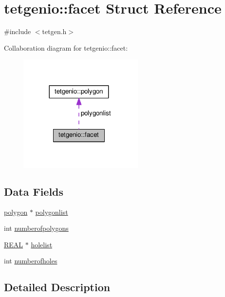 \hypertarget{structtetgenio_1_1facet}{}\section{tetgenio\+:\+:facet Struct Reference}
\label{structtetgenio_1_1facet}


{\ttfamily \#include $<$tetgen.\+h$>$}



Collaboration diagram for tetgenio\+:\+:facet\+:
\nopagebreak
\begin{figure}[H]
\begin{center}
\leavevmode
\includegraphics[width=176pt]{structtetgenio_1_1facet__coll__graph}
\end{center}
\end{figure}
\subsection*{Data Fields}
\begin{DoxyCompactItemize}
\item 
\hyperlink{structtetgenio_1_1polygon}{polygon} $\ast$ \hyperlink{structtetgenio_1_1facet_ad73474fc4f07efdd714f0441948c5dfa}{polygonlist}
\item 
int \hyperlink{structtetgenio_1_1facet_a845d93a1341532b2f0de8b1e75a5d0bb}{numberofpolygons}
\item 
\hyperlink{tetgen_8h_a4b654506f18b8bfd61ad2a29a7e38c25}{R\+E\+AL} $\ast$ \hyperlink{structtetgenio_1_1facet_aecc34fbcd7087b45baecf2ba43d57757}{holelist}
\item 
int \hyperlink{structtetgenio_1_1facet_acc9857df4007aa20199f8979353339c7}{numberofholes}
\end{DoxyCompactItemize}


\subsection{Detailed Description}


